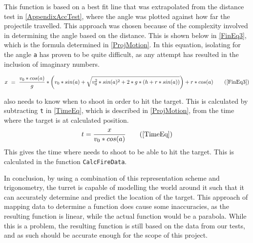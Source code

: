 This function is based on a best fit line that was extrapolated from the
distance test in \autoref{AppendixAccTest}, where the angle was plotted against how far
the projectile travelled. This approach was chosen because of the complexity
involved in determining the angle based on the distance. This is shown below in
\autoref{FinEq3}, which is the formula determined in \autoref{ProjMotion}. In
this equation, isolating for the angle \texttt{a} has proven to be quite
difficult, as any attempt has resulted in the inclusion of imaginary numbers.

\begin{equation*}
x\ =\ \frac{v_0*cos(a)}{g}* \left(
v_0*sin(a)+\sqrt{v_0^2*sin(a)^2+2*g*(h+r*sin(a))}\right)+r*cos(a)
\tag{\ref*{FinEq3}}
\end{equation*}

\name also needs to know when to shoot in order to hit the target.
This is calculated by subtracting \texttt{t} in \autoref{TimeEq}, which is described in
\autoref{ProjMotion}, from the time where the target is at calculated position.
\begin{equation*}
t=\frac{x}{v_0*cos(a)}
\tag{\ref*{TimeEq}}
\end{equation*}
This gives the time where \name needs to shoot to be able to hit the target.
This is calculated in the function \texttt{CalcFireData}.\nl

In conclusion, by using a combination of this representation scheme and
trigonometry, the turret is capable of modelling the world around it such that
it can accurately determine and predict the location of the target. This
approach of mapping data to determine a function does cause some inaccuracies,
as the resulting function is linear, while the actual function would be a parabola.
While this is a problem, the resulting function is still based on the data from
our tests, and as such should be accurate enough for the scope of this
project.
